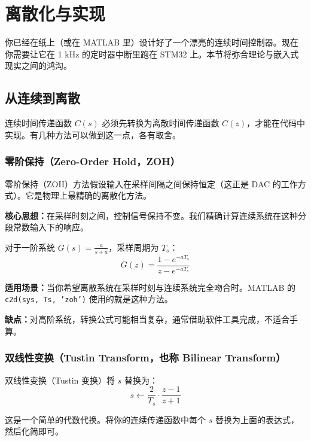 \section{离散化与实现}

你已经在纸上（或在 MATLAB 里）设计好了一个漂亮的连续时间控制器。现在你需要让它在 1 kHz 的定时器中断里跑在 STM32 上。本节将弥合理论与嵌入式现实之间的鸿沟。

\subsection{从连续到离散}

连续时间传递函数 $C(s)$ 必须先转换为离散时间传递函数 $C(z)$，才能在代码中实现。有几种方法可以做到这一点，各有取舍。

\subsubsection{零阶保持（Zero-Order Hold，ZOH）}

零阶保持（ZOH）方法假设输入在采样间隔之间保持恒定（这正是 DAC 的工作方式）。它是物理上最精确的离散化方法。

\textbf{核心思想：}在采样时刻之间，控制信号保持不变。我们精确计算连续系统在这种分段常数输入下的响应。

对于一阶系统 $G(s) = \frac{a}{s + a}$，采样周期为 $T_s$：
\begin{equation}
G(z) = \frac{1 - e^{-aT_s}}{z - e^{-aT_s}}
\end{equation}

\textbf{适用场景：}当你希望离散系统在采样时刻与连续系统完全吻合时。MATLAB 的 \texttt{c2d(sys, Ts, 'zoh')} 使用的就是这种方法。

\textbf{缺点：}对高阶系统，转换公式可能相当复杂，通常借助软件工具完成，不适合手算。

\subsubsection{双线性变换（Tustin Transform，也称 Bilinear Transform）}

双线性变换（Tustin 变换）将 $s$ 替换为：
\begin{equation}
s \leftarrow \frac{2}{T_s} \cdot \frac{z - 1}{z + 1}
\end{equation}

这是一个简单的代数代换。将你的连续传递函数中每个 $s$ 替换为上面的表达式，然后化简即可。

